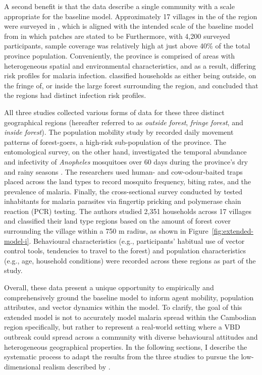 A second benefit is that the data describe a single community with a scale appropriate for the baseline model. Approximately 17 villages in the  of the region were surveyed in \citet{sandfort_forest_2020}, which is aligned with the intended scale of the baseline model from \citet{manore_network-patch_2015} in which patches are stated to be  Furthermore, with 4,200 surveyed participants, sample coverage was relatively high at just above 40\% of the total province population. Conveniently, the province is comprised of areas with heterogeneous spatial and environmental characteristics, and as a result, differing risk profiles for malaria infection. \citet{sandfort_forest_2020, vantaux_anopheles_2021} classified households as either being outside, on the fringe of, or inside the large forest surrounding the region, and concluded that the regions had distinct infection risk profiles.

All three studies collected various forms of data for these three distinct geographical regions (hereafter referred to as \textit{outside forest}, \textit{fringe forest}, and \textit{inside forest}). The population mobility study by \citet{pepey_mobility_2022} recorded daily movement patterns of forest-goers, a high-risk sub-population of the province. The entomological survey, on the other hand, investigated the temporal abundance and infectivity of \textit{Anopheles} mosquitoes over 60 days during the province's dry and rainy seasons \cite{vantaux_anopheles_2021}. The researchers used human- and cow-odour-baited traps placed across the land types to record mosquito frequency, biting rates, and the prevalence of malaria. Finally, the cross-sectional survey conducted by \citet{sandfort_forest_2020} tested inhabitants for malaria parasites via fingertip pricking and polymerase chain reaction (PCR) testing. The authors studied 2,351 households across 17 villages and classified their land type regions based on the amount of forest cover surrounding the village within a 750 m radius, as shown in Figure~\ref{fig:extended-model-i}. Behavioural characteristics (e.g., participants' habitual use of vector control tools, tendencies to travel to the forest) and population characteristics (e.g., age, household conditions) were recorded across these regions as part of the study.

Overall, these data present a unique opportunity to empirically and comprehensively ground the baseline model to inform agent mobility, population attributes, and vector dynamics within the model. To clarify, the goal of this extended model is not to accurately model malaria spread within the Cambodian region specifically, but rather to represent a real-world setting where a VBD outbreak could spread across a community with diverse behavioural attitudes and heterogeneous geographical properties. In the following sections, I describe the systematic process to adapt the results from the three studies to pursue the low-dimensional realism described by \citet{bruch_agent-based_2015}.

